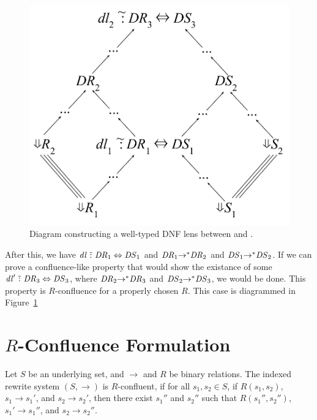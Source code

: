 \documentclass{easychair}
\begin{document}
\begin{figure}
  \centering
    \includegraphics[scale=.4]{equiv-case.pdf}
    \caption{Diagram constructing a well-typed DNF lens between
       and .}
    \label{fig:equiv-case}
\end{figure}

After this, we have $\mathit{dl} \,\,\tilde{:}\,\, \mathit{DR}_1 \Leftrightarrow
\mathit{DS}_1$ and $\mathit{DR}_1 {\rightarrow}^* \mathit{DR}_2$ and
$\mathit{DS}_1 {\rightarrow}^* \mathit{DS}_2$. If we can prove a
confluence-like property that would show the existance of some $\mathit{dl}'
\,\,\tilde{:}\,\, \mathit{DR}_3 \Leftrightarrow \mathit{DS}_3$, where
$\mathit{DR}_2 {\rightarrow}^* \mathit{DR}_3$ and $\mathit{DS}_2
{\rightarrow}^* \mathit{DS}_3$, we would be done. This property is
$R$-confluence for a properly chosen $R$. This case is diagrammed in Figure~\ref{fig:equiv-case}

\section{$R$-Confluence Formulation}
Let $S$ be an underlying set, and $\rightarrow$ and $R$ be binary relations. The
indexed rewrite system $(S,\rightarrow)$ is $R$-confluent, if for all $s_1,s_2 \in
S$, if $R(s_1,s_2)$, $s_1 \rightarrow s_1'$, and $s_2 \rightarrow s_2'$, then
there exist $s_1''$ and $s_2''$ such that $R(s_1'',s_2'')$, $s_1' \rightarrow
s_1''$, and $s_2 \rightarrow s_2''$.
\end{document}
